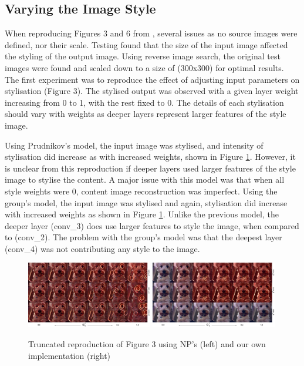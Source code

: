 \documentclass{article} %
\begin{document}
\subsection{Varying the Image Style}\label{ss:style}
When reproducing Figures 3 and 6 from \cite{babaeizadeh2018adjustable}, several issues as no source images were defined, nor their scale. Testing found that the size of the input image affected the styling of the output image. Using reverse image search, the original test images were found and scaled down to a size of (300x300) for optimal results. The first experiment was to reproduce the effect of adjusting input parameters on stylisation (Figure 3). The stylised output was observed with a given layer weight increasing from 0 to 1, with the rest fixed to 0. The details of each stylisation should vary with weights as deeper layers represent larger features of the style image.

Using Prudnikov's model, the input image was stylised, and intensity of stylisation did increase as with increased weights, shown in Figure \ref{fig3}. However, it is unclear from this reproduction if deeper layers used larger features of the style image to stylise the content. A major issue with this model was that when all style weights were 0, content image reconstruction was imperfect. Using the group's model, the input image was stylised and again, stylisation did increase with increased weights as shown in Figure \ref{fig3}. Unlike the previous model, the deeper layer (conv\_3) does use larger features to style the image, when compared to (conv\_2). The problem with the group's model was that the deepest layer (conv\_4) was not contributing any style to the image.

\begin{figure}[h!]
    \centering
    \includegraphics[width=0.49\textwidth, scale=0.1]{fig3_old_small.png}
    \includegraphics[width=0.49\textwidth, scale=0.1]{fig3_ours_small.png}
    \vspace{-3mm}
    \caption{Truncated reproduction of Figure 3 using NP's (left) and our own implementation (right)}
    \label{fig3}
\end{figure}
\end{document}
